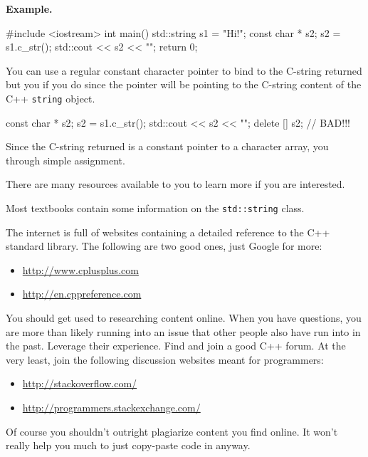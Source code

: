 \textbf{Example.}

\begin{console}
#include <iostream>
int main()
{   
    std::string s1 = "Hi!";
    const char * s2;
    s2 = s1.c_str();
    std::cout << s2 << "\n";
    return 0;
}
\end{console}

You can use a regular constant character pointer to bind to the C-string returned but you  if you do since the pointer will be pointing to the C-string content of the C++ \texttt{string} object.

\begin{console}
const char * s2;
s2 = s1.c_str();
std::cout << s2 << "\n";
delete [] s2; // BAD!!!
\end{console}

Since the C-string returned is a constant pointer to a character array,
you  through simple
assignment.


\newpage{}

There are many resources available to you to learn more if you are
interested.

Most textbooks contain some information on the \texttt{std::string} class.

The internet is full of websites containing a detailed reference to the
C++ standard library. The following are two good ones, just Google for
more:

\begin{itemize}
\item
  \href{http://www.cplusplus.com/}{http://www.cplusplus.com}
\item
  \href{http://en.cppreference.com/}{http://en.cppreference.com}
\end{itemize}

You should get used to researching content online. When you have
questions, you are more than likely running into an issue that other
people also have run into in the past. Leverage their experience. Find
and join a good C++ forum. At the very least, join the following
discussion websites meant for programmers:

\begin{itemize}
\item
  \url{http://stackoverflow.com/}
\item
  \url{http://programmers.stackexchange.com/}
\end{itemize}

Of course you shouldn't outright plagiarize content you find online. It won't really help you much to just copy-paste code in anyway.

\newpage{}

